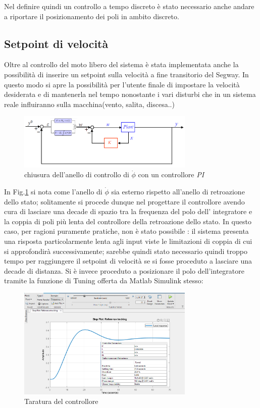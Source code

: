 Nel definire quindi un controllo a tempo discreto è stato necessario anche andare a riportare il posizionamento dei poli in ambito discreto.
\subsection{Setpoint di velocità}
Oltre al controllo del moto libero del sistema è stata implementata anche la possibilità di inserire un setpoint sulla velocità a fine transitorio del Segway. In questo modo si apre la possibilità per l'utente finale di impostare la velocità desiderata e di mantenerla nel tempo nonostante i vari disturbi che in un sistema reale influiranno sulla macchina(vento, salita, discesa..) 
\begin{figure}[H]
	\centering   	
	\includegraphics[width=0.75\textwidth]{Immagini/y_setpoint.png}
	\caption{chiusura dell'anello di controllo di $\dot{\phi}$ con un controllore \textit{PI}}
	\label{fig:y_setpoint}
\end{figure}
In Fig.\ref{fig:y_setpoint} si nota come l'anello di $\dot{\phi}$ sia esterno rispetto all'anello di retroazione dello stato; solitamente si procede dunque nel progettare il controllore avendo cura di lasciare una decade di spazio tra la frequenza del polo dell' integratore e la coppia di poli più lenta del controllore della retroazione dello stato.
In questo caso, per ragioni puramente pratiche, non è stato possibile : il sistema presenta una risposta particolarmente lenta agli input viste le limitazioni di coppia di cui si approfondirà successivamente; sarebbe quindi stato necessario quindi troppo tempo per raggiungere il setpoint di velocità se si fosse proceduto a lasciare una decade di distanza. Si è invece proceduto a posizionare il polo dell'integratore tramite la funzione di Tuning offerta da Matlab Simulink stesso:
\begin{figure}[H]
	\centering   	
	\includegraphics[width=0.75\textwidth]{Immagini/pid_tuning.png}
	\caption{Taratura del controllore}
	\label{fig:pid_tuning}
\end{figure}
